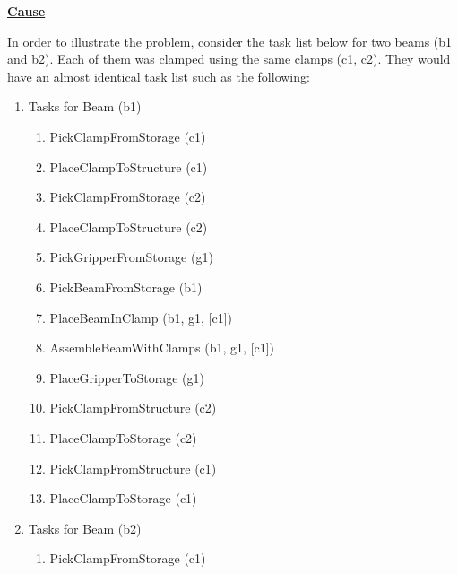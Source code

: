 {\textbf{\ul{Cause}}

In order to illustrate the problem, consider the task list below for two beams (b1 and b2). Each of them was clamped using the same clamps (c1, c2). They would have an almost identical task list such as the following:

\begin{enumerate}
	\item {\footnotesize Tasks for Beam (b1) }

\begin{enumerate}
	\item {\footnotesize PickClampFromStorage (c1)}

	\item {\footnotesize PlaceClampToStructure (c1)}

	\item {\footnotesize PickClampFromStorage (c2)}

	\item {\footnotesize PlaceClampToStructure (c2)}

	\item {\footnotesize PickGripperFromStorage (g1)}

	\item {\footnotesize PickBeamFromStorage (b1)}

	\item {\footnotesize PlaceBeamInClamp (b1, g1, [c1])}

	\item {\footnotesize AssembleBeamWithClamps (b1, g1, [c1])}

	\item {\footnotesize PlaceGripperToStorage (g1)}

	\item {\footnotesize PickClampFromStructure (c2)}

	\item {\footnotesize PlaceClampToStorage (c2)}

	\item {\footnotesize PickClampFromStructure (c1)}

	\item {\footnotesize PlaceClampToStorage (c1)}

\end{enumerate}
	\item {\footnotesize Tasks for Beam (b2) }

\begin{enumerate}
	\item {\footnotesize PickClampFromStorage (c1)}


\end{enumerate}
\end{enumerate}}
